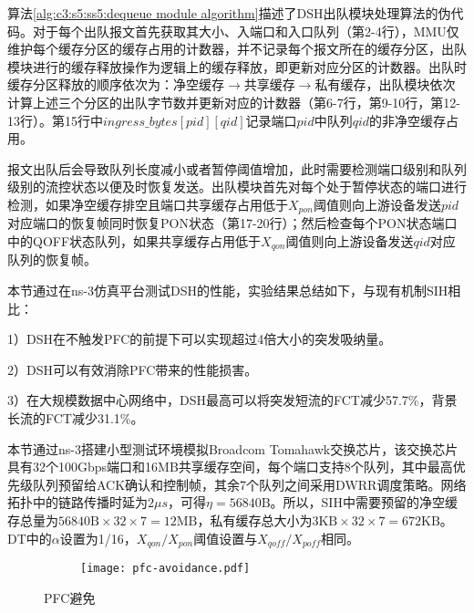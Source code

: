 算法\ref{alg:c3:s5:ss5:dequeue module algorithm}描述了DSH出队模块处理算法的伪代码。对于每个出队报文首先获取其大小、入端口和入口队列（第2-4行），MMU仅维护每个缓存分区的缓存占用的计数器，并不记录每个报文所在的缓存分区，出队模块进行的缓存释放操作为逻辑上的缓存释放，即更新对应分区的计数器。出队时缓存分区释放的顺序依次为：净空缓存$\rightarrow$共享缓存$\rightarrow$私有缓存，出队模块依次计算上述三个分区的出队字节数并更新对应的计数器（第6-7行，第9-10行，第12-13行）。第15行中$ingress\_bytes[pid][qid]$记录端口$pid$中队列$qid$的非净空缓存占用。

报文出队后会导致队列长度减小或者暂停阈值增加，此时需要检测端口级别和队列级别的流控状态以便及时恢复发送。出队模块首先对每个处于暂停状态的端口进行检测，如果净空缓存排空且端口共享缓存占用低于$X_{pon}$阈值则向上游设备发送$pid$对应端口的恢复帧同时恢复PON状态（第17-20行）；然后检查每个PON状态端口中的QOFF状态队列，如果共享缓存占用低于$X_{qon}$阈值则向上游设备发送$qid$对应队列的恢复帧。


\label{c3:s6:dsh evaluation}

本节通过在ns-3仿真平台\cite{ns-3}测试DSH的性能，实验结果总结如下，与现有机制SIH相比：

1）DSH在不触发PFC的前提下可以实现超过4倍大小的突发吸纳量。

2）DSH可以有效消除PFC带来的性能损害。

3）在大规模数据中心网络中，DSH最高可以将突发短流的FCT减少57.7\%，背景长流的FCT减少31.1\%。

\label{c3:s5:ss1:basic performance evaluation}

本节通过ns-3搭建小型测试环境模拟Broadcom Tomahawk交换芯片，该交换芯片具有32个100Gbps端口和16MB共享缓存空间，每个端口支持8个队列，其中最高优先级队列预留给ACK确认和控制帧，其余7个队列之间采用DWRR调度策略。网络拓扑中的链路传播时延为$2 \mu s$，可得$\eta=\text{56840B}$。所以，SIH中需要预留的净空缓存总量为$\text{56840B} \times 32 \times 7 = \text{12MB}$，私有缓存总大小为$\text{3KB} \times 32 \times 7 = \text{672KB}$。DT中的$\alpha$设置为1/16\cite{SIGCOMM16RDMA}，$X_{qon} / X_{pon}$阈值设置与$X_{\mathit{qoff}} / X_{\mathit{poff}}$相同。

\begin{figure}[H]
  \begin{subfigure}[b]{0.49\linewidth}
      \centering
      \resizebox{0.95\linewidth}{!}{}
      \label{c3:s6:ss1:fig:sub1:pfc avoidance scenario}
  \end{subfigure}
  \begin{subfigure}[b]{0.49\linewidth}
      \centering
      \texttt{[image: pfc-avoidance.pdf]}
      \label{c3:s6:ss1:fig:sub1:total pause duration}
  \end{subfigure}
  \caption{PFC避免}
  \label{c3:s6:ss1:fig:sub1:pfc avoidance}
\end{figure}

